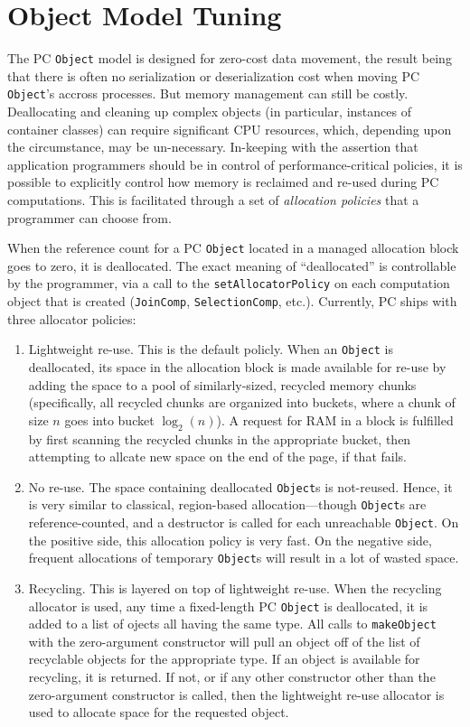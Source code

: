 \section{Object Model Tuning}

\noindent
The PC \texttt{Object} model is designed for zero-cost data movement, the result being that there is often no serialization or deserialization
cost
when moving PC \texttt{Object}'s accross processes.  But memory management can still be costly.  Deallocating and cleaning
up complex objects (in particular, instances of container classes) can require significant CPU resources, which, depending upon the 
circumstance, may be un-necessary.  In-keeping with the assertion that application programmers should be in
control of performance-critical policies, it is possible to explicitly control how memory is reclaimed and re-used during PC computations.
This is facilitated through a set of \emph{allocation policies} that a programmer can choose from.

When the reference count for a PC \texttt{Object} located in a managed allocation block goes to zero, it is deallocated.  The exact
meaning of ``deallocated'' is controllable by the programmer, via a call to the \texttt{setAllocatorPolicy} on each computation object
that is created (\texttt{JoinComp}, \texttt{SelectionComp}, etc.).  Currently, PC ships with
three allocator policies:

\begin{enumerate}

\item Lightweight re-use.  This is the default policly.  When an \texttt{Object} is deallocated, its space in the allocation block is made available for re-use by
adding the space to a pool of similarly-sized, recycled memory chunks (specifically, all recycled chunks are organized into buckets, where a chunk of size
$n$ goes into bucket $\log_2 (n)$).  A request for RAM in a block is fulfilled by first scanning the recycled chunks in the appropriate bucket, then
attempting to allcate new space on the end of the page, if that fails.
\item No re-use.  The space containing deallocated \texttt{Object}s is not-reused.  Hence, it is very similar to classical, region-based allocation---though \texttt{Object}s
are reference-counted, and a destructor is called for each unreachable \texttt{Object}.
On the positive side, this allocation policy is very fast.  On the negative side, frequent allocations of temporary \texttt{Object}s will result in a lot of wasted space.
\item Recycling.  This is layered on top of lightweight re-use.  When the recycling allocator is used, any time a fixed-length
PC \texttt{Object} is deallocated, it is
added to a list of ojects all having the same type.  All calls to \texttt{makeObject} with the zero-argument constructor will
pull an object off of the list of recyclable objects for the appropriate type.  
If an object is available for recycling, it is returned.  If not, or if any other constructor other than the zero-argument constructor is called, 
then the lightweight re-use allocator is used to allocate space for the requested
object.

\end{enumerate}

